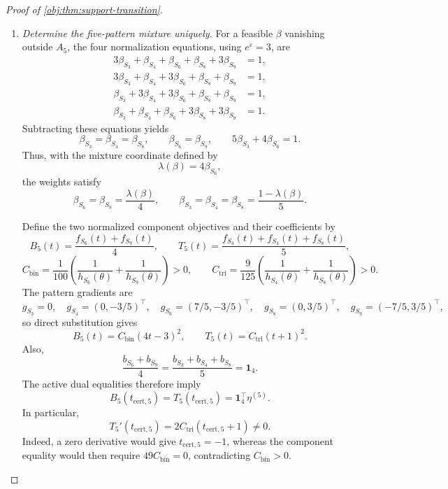 \begin{proof}[Proof of \cref{obj:thm:support-transition}]
\begin{enumerate}
\item \emph{Determine the five-pattern mixture uniquely.}
For a feasible \(\beta\) vanishing outside \(A_5\), the four normalization equations, using \(e^\varepsilon=3\), are
\[
\begin{aligned}
3\beta_{S_3}+\beta_{S_4}+\beta_{S_6}+\beta_{S_8}+3\beta_{S_9}&=1,\\
3\beta_{S_3}+\beta_{S_4}+3\beta_{S_6}+\beta_{S_8}+\beta_{S_9}&=1,\\
\beta_{S_3}+3\beta_{S_4}+3\beta_{S_6}+\beta_{S_8}+\beta_{S_9}&=1,\\
\beta_{S_3}+\beta_{S_4}+\beta_{S_6}+3\beta_{S_8}+3\beta_{S_9}&=1.
\end{aligned}
\]
Subtracting these equations yields
\[
\beta_{S_3}=\beta_{S_4}=\beta_{S_8},
\qquad
\beta_{S_6}=\beta_{S_9},
\qquad
5\beta_{S_3}+4\beta_{S_6}=1.
\]
Thus, with the mixture coordinate defined by
\[
\lambda(\beta)=4\beta_{S_6},
\]
the weights satisfy
\[
\beta_{S_6}=\beta_{S_9}=\frac{\lambda(\beta)}4,
\qquad
\beta_{S_3}=\beta_{S_4}=\beta_{S_8}
=\frac{1-\lambda(\beta)}5.
\]

Define the two normalized component objectives and their coefficients by
\[
B_5(t)=\frac{f_{S_6}(t)+f_{S_9}(t)}4,
\qquad
T_5(t)=\frac{f_{S_3}(t)+f_{S_4}(t)+f_{S_8}(t)}5,
\]
\[
C_{\mathrm{bin}}=\frac1{100}
 \left(\frac1{h_{S_6}(\theta)}+\frac1{h_{S_9}(\theta)}\right)>0,
\qquad
C_{\mathrm{tri}}=\frac9{125}
 \left(\frac1{h_{S_4}(\theta)}+\frac1{h_{S_8}(\theta)}\right)>0.
\]
The pattern gradients are
\[
g_{S_3}=0,\quad
g_{S_4}=(0,-3/5)^\top,\quad
g_{S_6}=(7/5,-3/5)^\top,\quad
g_{S_8}=(0,3/5)^\top,\quad
g_{S_9}=(-7/5,3/5)^\top,
\]
so direct substitution gives
\[
B_5(t)=C_{\mathrm{bin}}(4t-3)^2,
\qquad
T_5(t)=C_{\mathrm{tri}}(t+1)^2.
\]
Also,
\[
\frac{b_{S_6}+b_{S_9}}4
=\frac{b_{S_3}+b_{S_4}+b_{S_8}}5
=\mathbf1_4.
\]
The active dual equalities therefore imply
\[
B_5(t_{\mathrm{cert},5})
=T_5(t_{\mathrm{cert},5})
=\mathbf1_4^\top\eta^{(5)}.
\]
In particular,
\[
T_5'(t_{\mathrm{cert},5})
=2C_{\mathrm{tri}}(t_{\mathrm{cert},5}+1)\ne0.
\]
Indeed, a zero derivative would give \(t_{\mathrm{cert},5}=-1\), whereas the component equality would then require
\(49C_{\mathrm{bin}}=0\), contradicting \(C_{\mathrm{bin}}>0\).


\end{enumerate}
\end{proof}
